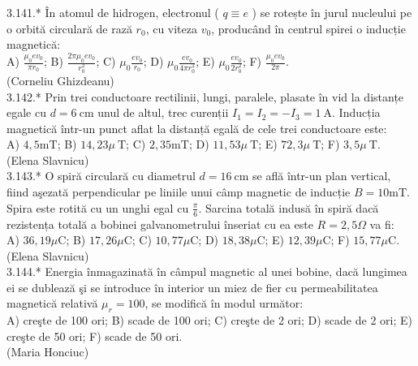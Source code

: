 3.141.* În atomul de hidrogen, electronul ( $q \equiv e$ ) se rotește în jurul nucleului pe o orbită circulară de rază $r_{0}$, cu viteza $v_{0}$, producând în centrul spirei o inducție magnetică:\\ A) $\frac{\mu_{0} e v_{0}}{\pi r_{0}}$; B) $\frac{2 \pi \mu_{0} e v_{0}}{r_{0}^{2}}$; C) $\mu_{0} \frac{e v_{0}}{r_{0}}$; D) $\mu_{0} \frac{e v_{0}}{4 \pi r_{0}^{2}}$; E) $\mu_{0} \frac{e v_{0}}{2 r_{0}^{2}}$; F) $\frac{\mu_{0} e v_{0}}{2 \pi}$.\\ (Corneliu Ghizdeanu)\\

3.142.* Prin trei conductoare rectilinii, lungi, paralele, plasate în vid la distanțe egale cu $d=6 \mathrm{~cm}$ unul de altul, trec curenții $I_{1}=I_{2}=-I_{3}=1 \mathrm{~A}$. Inducția magnetică într-un punct aflat la distanță egală de cele trei conductoare este:\\ A) $4,5 \mathrm{mT}$; B) $14,23 \mu \mathrm{~T}$; C) $2,35 \mathrm{mT}$; D) $11,53 \mu \mathrm{~T}$; E) $72,3 \mu \mathrm{~T}$; F) $3,5 \mu \mathrm{~T}$.\\ (Elena Slavnicu)\\

3.143.* O spiră circulară cu diametrul $d=16 \mathrm{~cm}$ se află într-un plan vertical, fiind aşezată perpendicular pe liniile unui câmp magnetic de inducție $B=10 \mathrm{mT}$. Spira este rotită cu un unghi egal cu $\frac{\pi}{6}$. Sarcina totală indusă în spiră dacă rezistența totală a bobinei galvanometrului înseriat cu ea este $R=2,5 \Omega$ va fi:\\ A) $36,19 \mu \mathrm{C}$; B) $17,26 \mu \mathrm{C}$; C) $10,77 \mu \mathrm{C}$; D) $18,38 \mu \mathrm{C}$; E) $12,39 \mu \mathrm{C}$; F) $15,77 \mu \mathrm{C}$.\\ (Elena Slavnicu)\\

3.144.* Energia înmagazinată în câmpul magnetic al unei bobine, dacă lungimea ei se dublează şi se introduce în interior un miez de fier cu permeabilitatea magnetică relativă $\mu_{r}=100$, se modifică în modul următor:\\ A) creşte de 100 ori; B) scade de 100 ori; C) creşte de 2 ori; D) scade de 2 ori; E) creşte de 50 ori; F) scade de 50 ori.\\ (Maria Honciuc)\\


